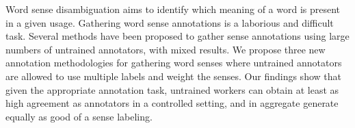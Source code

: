 Word sense disambiguation aims to identify which meaning of a word is present in a given usage. Gathering word sense annotations is a laborious and difficult
 task.  Several methods have been proposed to gather sense annotations using
 large numbers of untrained annotators, with mixed results.  We propose three
 new annotation methodologies for gathering word senses where untrained
 annotators are allowed to use multiple labels and weight the senses.  Our
 findings show that given the appropriate annotation task, untrained workers can
 obtain at least as high agreement as annotators in a controlled setting, and in
 aggregate generate equally as good of a sense labeling.

